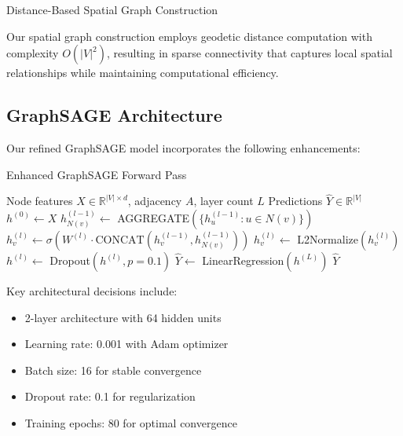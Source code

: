 \documentclass[twocolumn,11pt]{IEEEtran}  %
\begin{document}
\begin{algorithm}
\caption{Distance-Based Spatial Graph Construction}
\label{alg:graph_construction}
\begin{algorithmic}[1]
        \ENDIF
    \ENDFOR
\ENDFOR
{}
\end{algorithmic}
\end{algorithm}

Our spatial graph construction employs geodetic distance computation with complexity $O(|V|^2)$, resulting in sparse connectivity that captures local spatial relationships while maintaining computational efficiency.

\subsection{GraphSAGE Architecture}

Our refined GraphSAGE model incorporates the following enhancements:

\begin{algorithm}
\caption{Enhanced GraphSAGE Forward Pass}
\label{alg:graphsage}
\begin{algorithmic}[1]
\REQUIRE Node features $X \in \mathbb{R}^{|V| \times d}$, adjacency $A$, layer count $L$
\ENSURE Predictions $\hat{Y} \in \mathbb{R}^{|V|}$
\STATE $h^{(0)} \leftarrow X$
        \STATE $h_{N(v)}^{(l-1)} \leftarrow$ AGGREGATE$(\{h_u^{(l-1)} : u \in N(v)\})$
        \STATE $h_v^{(l)} \leftarrow \sigma(W^{(l)} \cdot \text{CONCAT}(h_v^{(l-1)}, h_{N(v)}^{(l-1)}))$
        \STATE $h_v^{(l)} \leftarrow$ L2Normalize$(h_v^{(l)})$
    \ENDFOR
    \STATE $h^{(l)} \leftarrow$ Dropout$(h^{(l)}, p=0.1)$
\ENDFOR
\STATE $\hat{Y} \leftarrow$ LinearRegression$(h^{(L)})$
\RETURN $\hat{Y}$
\end{algorithmic}
\end{algorithm}

Key architectural decisions include:
\begin{itemize}
\item 2-layer architecture with 64 hidden units
\item Learning rate: 0.001 with Adam optimizer
\item Batch size: 16 for stable convergence
\item Dropout rate: 0.1 for regularization
\item Training epochs: 80 for optimal convergence
\end{itemize}
\end{document}
